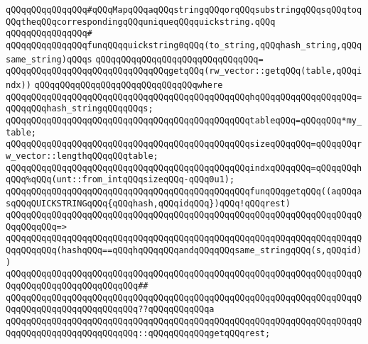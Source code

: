 \newline
\newline
\newline
\verb|qQQqqQQqqQQqqQQq#qQQqMapqQQqaqQQqstringqQQqorqQQqsubstringqQQqsqQQqtoqQQqtheqQQqcorrespondingqQQquniqueqQQqquickstring.qQQq|\newline
\verb|qQQqqQQqqQQqqQQq#|\newline
\verb|qQQqqQQqqQQqqQQqfunqQQqquickstring0qQQq(to_string,qQQqhash_string,qQQqsame_string)qQQqs|\newline
\verb|qQQqqQQqqQQqqQQqqQQqqQQqqQQqqQQq=|\newline
\verb|qQQqqQQqqQQqqQQqqQQqqQQqqQQqqQQqgetqQQq(rw_vector::getqQQq(table,qQQqindx))|\newline
\verb|qQQqqQQqqQQqqQQqqQQqqQQqqQQqqQQqwhere|\newline
\newline
\verb|qQQqqQQqqQQqqQQqqQQqqQQqqQQqqQQqqQQqqQQqqQQqqQQqhqQQqqQQqqQQqqQQqqQQq=qQQqqQQqhash_stringqQQqqQQqs;|\newline
\verb|qQQqqQQqqQQqqQQqqQQqqQQqqQQqqQQqqQQqqQQqqQQqqQQqtableqQQq=qQQqqQQq*my_table;|\newline
\verb|qQQqqQQqqQQqqQQqqQQqqQQqqQQqqQQqqQQqqQQqqQQqqQQqsizeqQQqqQQq=qQQqqQQqrw_vector::lengthqQQqqQQqtable;|\newline
\verb|qQQqqQQqqQQqqQQqqQQqqQQqqQQqqQQqqQQqqQQqqQQqqQQqindxqQQqqQQq=qQQqqQQqhqQQq%qQQq(unt::from_intqQQqsizeqQQq-qQQq0u1);|\newline
\newline
\verb|qQQqqQQqqQQqqQQqqQQqqQQqqQQqqQQqqQQqqQQqqQQqqQQqfunqQQqgetqQQq((aqQQqasqQQqQUICKSTRINGqQQq{qQQqhash,qQQqidqQQq})qQQq!qQQqrest)|\newline
\verb|qQQqqQQqqQQqqQQqqQQqqQQqqQQqqQQqqQQqqQQqqQQqqQQqqQQqqQQqqQQqqQQqqQQqqQQqqQQqqQQq=>|\newline
\verb|qQQqqQQqqQQqqQQqqQQqqQQqqQQqqQQqqQQqqQQqqQQqqQQqqQQqqQQqqQQqqQQqqQQqqQQqqQQqqQQq(hashqQQq==qQQqhqQQqqQQqandqQQqqQQqsame_stringqQQq(s,qQQqid))|\newline
\verb|qQQqqQQqqQQqqQQqqQQqqQQqqQQqqQQqqQQqqQQqqQQqqQQqqQQqqQQqqQQqqQQqqQQqqQQqqQQqqQQqqQQqqQQqqQQqqQQq##|\newline
\verb|qQQqqQQqqQQqqQQqqQQqqQQqqQQqqQQqqQQqqQQqqQQqqQQqqQQqqQQqqQQqqQQqqQQqqQQqqQQqqQQqqQQqqQQqqQQqqQQq??qQQqqQQqqQQqa|\newline
\verb|qQQqqQQqqQQqqQQqqQQqqQQqqQQqqQQqqQQqqQQqqQQqqQQqqQQqqQQqqQQqqQQqqQQqqQQqqQQqqQQqqQQqqQQqqQQqqQQq::qQQqqQQqqQQqgetqQQqrest;|\newline
\newline

